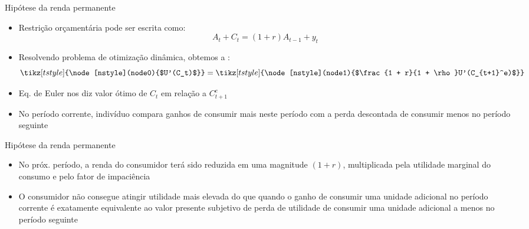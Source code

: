 \documentclass[10pt]{beamer}
\begin{document}
\begin{frame}
    {Hipótese da renda permanente}
    \begin{itemize}
        \item Restrição orçamentária pode ser escrita como:
        \begin{equation}
            A_t + C_t = (1 + r)A_{t-1} + y_t
            \label{aula7_eq5}
        \end{equation}
        \item Resolvendo problema de otimização dinâmica, obtemos a :
        \begin{equation}
            \tikz[tstyle]{\node[nstyle](node0){$U'(C_t)$}} = \tikz[tstyle]{\node[nstyle](node1){$\frac{1 + r}{1 + \rho}U'(C_{t+1}^e)$}}
            \label{aula7_eq6}
        \end{equation}
        \item Eq. de Euler nos diz valor ótimo de $C_t$ em relação a $C_{t+1}^e$\bigskip
        \item No período corrente, indivíduo compara ganhos de consumir mais neste período com a perda descontada de consumir menos no período seguinte
    \end{itemize}
\end{frame}

\begin{frame}
    {Hipótese da renda permanente}
    \begin{itemize}
        \item No próx. período, a renda do consumidor terá sido reduzida em uma magnitude $(1 + r)$, multiplicada pela utilidade marginal do consumo e pelo fator de impaciência\bigskip
        \item O consumidor não consegue atingir utilidade mais elevada do que quando o ganho de consumir uma unidade adicional no período corrente é exatamente equivalente ao valor presente subjetivo de perda de utilidade de consumir uma unidade adicional a menos no período seguinte
    \end{itemize}
\end{frame}
\end{document}
